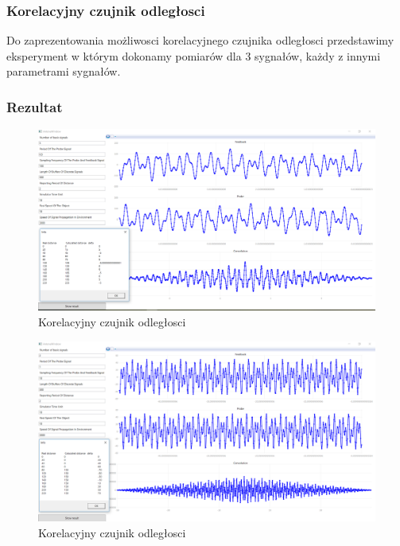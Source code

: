 \documentclass[12pt]{article}
\begin{document}
\subsubsection{Korelacyjny czujnik odległosci}
Do zaprezentowania możliwosci korelacyjnego czujnika odległosci przedstawimy eksperyment w którym dokonamy pomiarów dla 3 sygnałów, każdy z innymi parametrami sygnałów.


\subsubsection{Rezultat}

\begin{figure}[H]
 \centering
 \includegraphics[width=14cm]{images/a1.PNG}
 \vspace{-0.3cm}
 \caption{Korelacyjny czujnik odległosci}
 \label{gui}
\end{figure}

\begin{figure}[H]
 \centering
 \includegraphics[width=14cm]{images/a2.PNG}
 \vspace{-0.3cm}
 \caption{Korelacyjny czujnik odległosci}
 \label{gui}
\end{figure}
\end{document}
